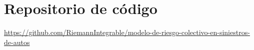 \section*{Repositorio de código}

\url{https://github.com/RiemannIntegrable/modelo-de-riesgo-colectivo-en-siniestros-de-autos}